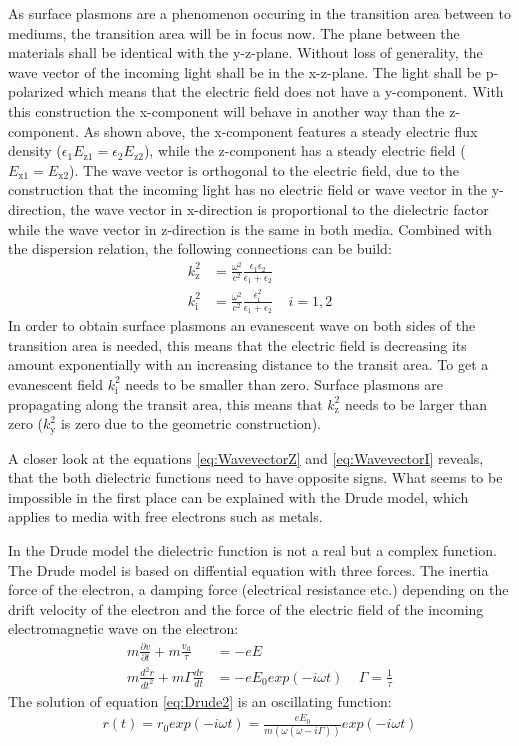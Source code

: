 \documentclass[ twoside,openright,titlepage,%
                paper=a4,fontsize=11pt,%
                ngerman
                ]{scrartcl}
\numberwithin{equation}{section}
\begin{document}
As surface plasmons are a phenomenon occuring in the transition area between to mediums, the transition area will be in focus now. The plane between the materials shall be identical with the y-z-plane. Without loss of generality, the wave vector of the incoming light shall be in the x-z-plane. The light shall be p-polarized which means that the electric field does not have a y-component. With this construction the x-component will behave in another way than the z-component. As shown above, the x-component features a steady electric flux density ($\epsilon_1 E_\text{z1} = \epsilon_2 E_\text{z2}$), while the z-component has a steady electric field ($E_\text{x1} = E_\text{x2}$). The wave vector is orthogonal to the electric field, due to the construction that the incoming light has no electric field or wave vector in the y-direction, the wave vector in x-direction is proportional to the dielectric factor while the wave vector in z-direction is the same in both media. Combined with the dispersion relation, the following connections can be build:
\begin{align}
k_\text{z}^2 &= \frac{\omega^2}{c^2} \frac{\epsilon_1 \epsilon_2}{\epsilon_1 + \epsilon_2} \label{eq:WavevectorZ} \\
k_\text{i}^2 &= \frac{\omega^2}{c^2} \frac{\epsilon_\text{i}^2}{\epsilon_1 + \epsilon_2} \label{eq:WavevectorI} \ \ \ \ \  i=1,2
\end{align}
In order to obtain surface plasmons an evanescent wave on both sides of the transition area is needed, this means that the electric field is decreasing its amount exponentially with an increasing distance to the transit area. To get a evanescent field $k_\text{i}^2$ needs to be smaller than zero. Surface plasmons are propagating along the transit area, this means that $k_\text{z}^2$ needs to be larger than zero ($k_\text{y}^2$ is zero due to the geometric construction). 

A closer look at the equations \ref{eq:WavevectorZ} and \ref{eq:WavevectorI} reveals, that the both dielectric functions need to have opposite signs. What seems to be impossible in the first place can be explained with the Drude model, which applies to media with free electrons such as metals. 

In the Drude model the dielectric function is not a real but a complex function. The Drude model is based on diffential equation with three forces. The inertia force of the electron, a damping force (electrical resistance etc.) depending on the drift velocity of the electron and the force of the electric field of the incoming electromagnetic wave on the electron:
\begin{align}
m \frac{\partial v}{\partial t} + m \frac{v_\text{d}}{\tau} &= -e E \label{eq:Drude1} \\
m \frac{d^2 r}{dt^2} + m \Gamma \frac{dr}{dt} &= -e E_0 exp(-i \omega t) \label{eq:Drude2} \ \ \ \ \ \Gamma = \frac{1}{\tau}
\end{align}
The solution of equation \ref{eq:Drude2} is an oscillating function:
\begin{align}
r(t) = r_0 exp(-i \omega t) = \frac{e E_0}{m(\omega(\omega - i \Gamma))} exp(-i \omega t) \label{eq:DrudeSolution}
\end{align}
\end{document}
